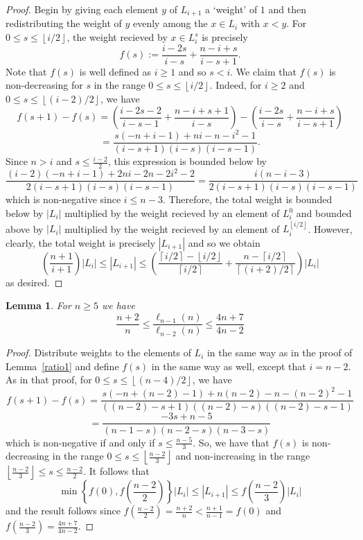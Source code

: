 \documentclass[11 pt]{article}
\newtheorem{lem}[equation]{Lemma}
\theoremstyle{definition}
\theoremstyle{case}
\numberwithin{equation}{section}
\begin{document}
\begin{proof}
Begin by giving each element $y$ of $L_{i+1}$ a `weight' of $1$ and then redistributing the weight of $y$ evenly among the $x\in L_i$ with $x<y$. For $0\leq s\leq \left\lfloor i/2\right\rfloor$, the weight recieved by $x\in L_i^s$ is precisely
\[f(s):=\frac{i-2s}{i-s} + \frac{n-i+s}{i-s+1}.\]
Note that $f(s)$ is well defined as $i\geq1$ and so $s < i$. We claim that $f(s)$ is non-decreasing for $s$ in the range $0\leq s\leq \left\lfloor i/2\right\rfloor$. Indeed, for $i\geq2$ and $0\leq s\leq \left\lfloor (i-2)/2\right\rfloor$, we have
\[f(s+1)-f(s) = \left(\frac{i-2s-2}{i-s-1} + \frac{n-i+s+1}{i-s}\right) - \left(\frac{i-2s}{i-s} + \frac{n-i+s}{i-s+1}\right)\]
\[=\frac{s(-n +i - 1) + ni - n -i^2-1}{(i-s+1)(i-s)(i-s-1)}.\]
Since $n>i$ and $s\leq \frac{i-2}{2}$, this expression is bounded below by
\[\frac{(i-2)(-n+i-1) + 2ni-2n-2i^2-2}{2(i-s+1)(i-s)(i-s-1)} = \frac{i(n-i-3)}{2(i-s+1)(i-s)(i-s-1)}\]
which is non-negative since $i\leq n-3$. Therefore, the total weight is bounded below by $|L_i|$ multiplied by the weight recieved by an element of $L_i^0$ and bounded above by $|L_i|$ multiplied by the weight recieved by an element of $L_i^{\left\lfloor i/2\right\rfloor}$. However, clearly, the total weight is precisely $|L_{i+1}|$ and so we obtain
\[\left(\frac{n+1}{i+1}\right)|L_i|\leq |L_{i+1}| \leq \left(\frac{\left\lceil i/2\right\rceil - \left\lfloor i/2\right\rfloor}{\left \lceil i/2\right\rceil} + \frac{n-\left\lceil i/2\right\rceil}{\left\lceil (i+2)/2\right\rceil}\right)|L_i|\]
as desired. 
\end{proof}

\begin{lem}
\label{ration-2}
For $n\geq5$ we have 
\[\frac{n+2}{n}\leq \frac{\ell_{n-1}(n)}{\ell_{n-2}(n)}\leq \frac{4n+7}{4n-2}\]	
\end{lem}

\begin{proof}
Distribute weights to the elements of $L_i$ in the same way as in the proof of Lemma~\ref{ratio1} and define $f(s)$ in the same way as well, except that $i=n-2$. As in that proof, for $0\leq s\leq \left\lfloor (n-4)/2\right\rfloor$, we have
\[f(s+1)-f(s) =\frac{s(-n + (n-2) - 1) + n(n-2) - n -(n-2)^2-1}{((n-2)-s+1)((n-2)-s)((n-2)-s-1)}\]
\[= \frac{-3s + n-5}{(n-1-s)(n-2-s)(n-3-s)}\]
which is non-negative if and only if $s\leq \frac{n-5}{3}$. So, we have that $f(s)$ is non-decreasing in the range $0\leq s\leq \left\lfloor\frac{n-2}{3}\right\rfloor$ and non-increasing in the range $\left\lfloor\frac{n-2}{3}\right\rfloor\leq s\leq\frac{n-2}{2}$. It follows that
\[\min\left\{f(0),f\left(\frac{n-2}{2}\right)\right\}|L_i|\leq |L_{i+1}| \leq f\left(\frac{n-2}{3}\right)|L_i|\]
and the result follows since $f\left(\frac{n-2}{2}\right) = \frac{n+2}{n} <\frac{n+1}{n-1} = f(0)$ and $f\left(\frac{n-2}{3}\right) = \frac{4n+7}{4n-2}$. 
\end{proof}
\end{document}
